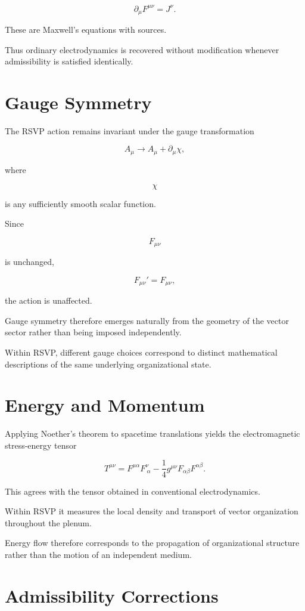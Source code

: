 \documentclass[11pt,oneside]{book}
\numberwithin{equation}{chapter}
\theoremstyle{definition}
\theoremstyle{plain}
\begin{document}
\[
\boxed{
\partial_\mu
F^{\mu\nu}
=
J^\nu.
}
\]

These are Maxwell's equations with sources.

Thus ordinary electrodynamics is recovered without modification whenever
admissibility is satisfied identically.

\section{Gauge Symmetry}

The RSVP action remains invariant under the gauge transformation

\[
A_\mu
\rightarrow
A_\mu
+
\partial_\mu\chi,
\]

where

\[
\chi
\]

is any sufficiently smooth scalar function.

Since

\[
F_{\mu\nu}
\]

is unchanged,

\[
F_{\mu\nu}'
=
F_{\mu\nu},
\]

the action is unaffected.

Gauge symmetry therefore emerges naturally from the geometry of the vector
sector rather than being imposed independently.

Within RSVP, different gauge choices correspond to distinct mathematical
descriptions of the same underlying organizational state.

\section{Energy and Momentum}

Applying Noether's theorem to spacetime translations yields the
electromagnetic stress-energy tensor

\[
T^{\mu\nu}
=
F^{\mu\alpha}
F^\nu_{\ \alpha}
-
\frac14
g^{\mu\nu}
F_{\alpha\beta}
F^{\alpha\beta}.
\]

This agrees with the tensor obtained in conventional electrodynamics.

Within RSVP it measures the local density and transport of vector
organization throughout the plenum.

Energy flow therefore corresponds to the propagation of organizational
structure rather than the motion of an independent medium.

\section{Admissibility Corrections}
\end{document}
